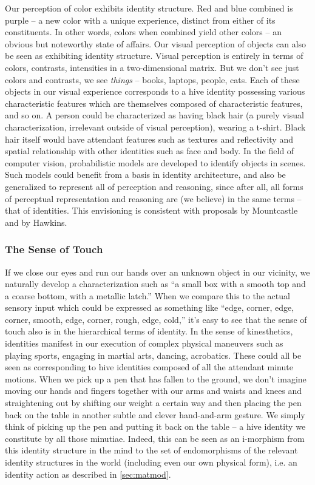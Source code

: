 \documentclass[pra,twocolumn,groupedaddress,10pt]{revtex4}
\theoremstyle{definition}
\begin{document}
Our perception of color exhibits identity structure. Red and blue combined is purple -- a new color with a unique experience, distinct from either of its constituents. In other words, colors when combined yield other colors -- an obvious but noteworthy state of affairs. Our visual perception of objects can also be seen as exhibiting identity structure. Visual perception is entirely in terms of colors, contrasts, intensities in a two-dimensional matrix. But we don't see just colors and contrasts, we see \textit{things} -- books, laptops, people, cats. Each of these objects in our visual experience corresponds to a hive identity possessing various characteristic features which are themselves composed of characteristic features, and so on. A person could be characterized as having black hair (a purely visual characterization, irrelevant outside of visual perception), wearing a t-shirt. Black hair itself would have attendant features such as textures and reflectivity and spatial relationship with other identities such as face and body. In the field of computer vision, probabilistic models are developed to identify objects in scenes. Such models could benefit from a basis in identity architecture, and also be generalized to represent all of perception and reasoning, since after all, all forms of perceptual representation and reasoning are (we believe) in the same terms -- that of identities. This envisioning is consistent with proposals by Mountcastle\cite{mountcastle} and by Hawkins\cite{hawkins}.

\subsubsection{The Sense of Touch} \label{sec:sentou}

If we close our eyes and run our hands over an unknown object in our vicinity, we naturally develop a characterization such as ``a small box with a smooth top and a coarse bottom, with a metallic latch.'' When we compare this to the actual sensory input which could be expressed as something like ``edge, corner, edge, corner, smooth, edge, corner, rough, edge, cold,'' it's easy to see that the sense of touch also is in the hierarchical terms of identity. In the sense of kinesthetics, identities manifest in our execution of complex physical maneuvers such as playing sports, engaging in martial arts, dancing, acrobatics. These could all be seen as corresponding to hive identities composed of all the attendant minute motions. When we pick up a pen that has fallen to the ground, we don't imagine moving our hands and fingers together with our arms and waists and knees and straightening out by shifting our weight a certain way and then placing the pen back on the table in another subtle and clever hand-and-arm gesture. We simply think of picking up the pen and putting it back on the table -- a hive identity we constitute by all those minutiae. Indeed, this can be seen as an i-morphism from this identity structure in the mind to the set of endomorphisms of the relevant identity structures in the world (including even our own physical form), i.e. an identity action as described in \autoref{sec:matmod}.
\end{document}
